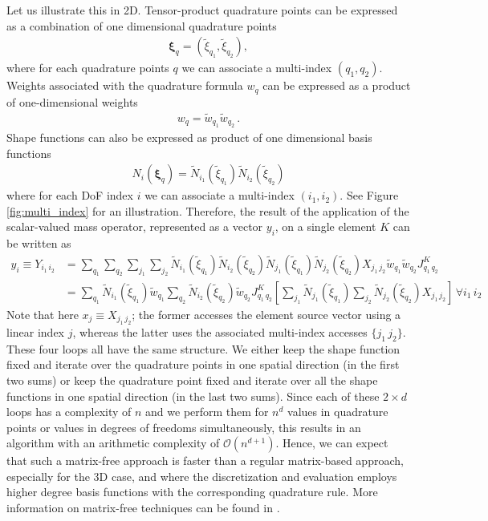 \documentclass[AMA,STIX1COL]{WileyNJD-v2}
\newcommand*{\gz}[1]{\boldsymbol{#1}}
\begin{document}
Let us illustrate this in 2D. Tensor-product quadrature points can be expressed as a combination of one dimensional quadrature points
\begin{align}
  \gz \xi_q = (\widetilde{\xi}_{q_1}, \widetilde{\xi}_{q_2}),
\end{align}
where for each quadrature points $q$ we can associate a multi-index $(q_1,q_2)$.
Weights associated with the quadrature formula $w_q$ can be expressed as a product of one-dimensional weights
\begin{align}
  w_q = \widetilde{w}_{q_1} \widetilde{w}_{q_2} \, .
\end{align}
Shape functions can also be expressed as product of one dimensional basis functions
\begin{align}
  N_i(\gz \xi_q) =
  \widetilde{N}_{i_1}(\widetilde{\xi}_{q_1})
  \widetilde{N}_{i_2}(\widetilde{\xi}_{q_2})
\end{align}
where for each DoF index $i$ we can associate a multi-index $(i_1, i_2)$.
See Figure \ref{fig:multi_index} for an illustration.
%
Therefore, the result of the application of the scalar-valued mass operator, represented as a vector $y_i$, on a single element $K$ can be written as
\begin{align*}
  y_{i} \equiv Y_{i_1\,i_2} & = \sum_{q_1} \sum_{q_2} \sum_{j_1} \sum_{j_2}
  \widetilde{N}_{i_1}(\widetilde{\xi}_{q_1})
  \widetilde{N}_{i_2}(\widetilde{\xi}_{q_2})
  \widetilde{N}_{j_1}(\widetilde{\xi}_{q_1})
  \widetilde{N}_{j_2}(\widetilde{\xi}_{q_2})
  X_{j_1\,j_2}
  \widetilde{w}_{q_1} \widetilde{w}_{q_2} J^K_{q_1\,q_2}
  \\
  &=
  \sum_{q_1} \widetilde{N}_{i_1}(\widetilde{\xi}_{q_1}) \widetilde{w}_{q_1}
  \sum_{q_2} \widetilde{N}_{i_2}(\widetilde{\xi}_{q_2}) \widetilde{w}_{q_2}
  J^K_{q_1\,q_2}
  \left[
    \sum_{j_1}
    \widetilde{N}_{j_1}(\widetilde{\xi}_{q_1})
    \sum_{j_2}
    \widetilde{N}_{j_2}(\widetilde{\xi}_{q_2})
    X_{j_1\,j_2}
  \right]\, \forall i_1 \, i_2
\end{align*}
%
Note that here $x_j \equiv X_{j_1\,j_2}$; the former accesses the element source vector using a linear index $j$,
whereas the latter uses the associated multi-index accesses $\{j_1\,j_2\}$.
%
These four loops all have the same structure.
We either keep the shape function fixed and iterate over the quadrature points in one spatial direction (in the first two sums) or
keep the quadrature point fixed and iterate over all the shape functions in one spatial direction (in the last two sums).
Since each of these $2\times d$ loops has a complexity of $n$ and we perform them for $n^d$ values in quadrature points or
values in degrees of freedoms simultaneously, this results in an algorithm with an arithmetic complexity of $\mathcal{O}(n^{d+1})$.
Hence, we can expect that such a matrix-free approach is faster than a regular matrix-based approach,
especially for the 3D case, and where the discretization and evaluation employs higher degree basis functions with the corresponding quadrature rule.
More information on matrix-free techniques can be found in \cite{kronbichler12,vos10}.
\end{document}
